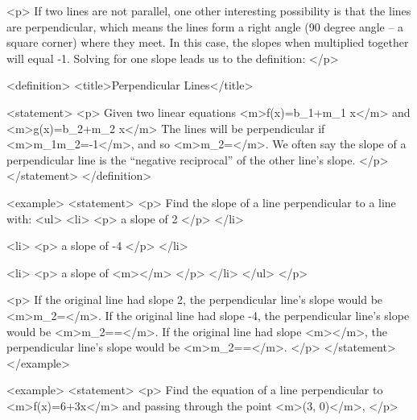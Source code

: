         <p>
            If two lines are not parallel, one other interesting possibility is that the lines are perpendicular, which means the lines form a right angle (90 degree angle – a square corner) where they meet.
            In this case, the slopes when multiplied together will equal -1.
            Solving for one slope leads us to the definition:
        </p>

        <definition>
            <title>Perpendicular Lines</title>

            <statement>
                <p>
                    Given two linear equations <m>f(x)=b_{1}+m_{1} x</m> and <m>g(x)=b_{2}+m_{2} x</m> The lines will be perpendicular if <m>m_{1}\times m_{2}=-1</m>, and so <m>m_{2}=</m>.
                    We often say the slope of a perpendicular line is the “negative reciprocal” of the other line’s slope.
                </p>
            </statement>
        </definition>

        <example>
            <statement>
                <p>
                    Find the slope of a line perpendicular to a line with:
                    <ul>
                        <li>
                            <p>
                                a slope of 2
                            </p>
                        </li>

                        <li>
                            <p>
                                a slope of -4
                            </p>
                        </li>

                        <li>
                            <p>
                                a slope of <m></m>
                            </p>
                        </li>
                    </ul>
                </p>

                <p>
                    If the original line had slope 2, the perpendicular line’s slope would be <m>m_{2}=</m>.
                    If the original line had slope -4, the perpendicular line’s slope would be <m>m_{2}==</m>.
                    If the original line had slope <m></m>, the perpendicular line’s slope would be <m>m_{2}==</m>.
                </p>
            </statement>
        </example>

        <example>
            <statement>
                <p>
                    Find the equation of a line perpendicular to <m>f(x)=6+3x</m> and passing through the point <m>(3, 0)</m>,
                </p>

